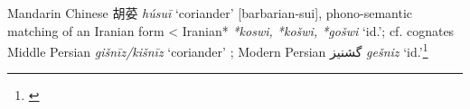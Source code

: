 \begin{etymology}\label{ety:husui}
Mandarin Chinese {胡荽} \textit{húsuī} `coriander' [barbarian-sui], phono-semantic matching of an Iranian form
< Iranian* \textit{*koswi, *košwi, *gošwi} `id.'; cf. cognates Middle Persian \textit{gišnīz/kišnīz} `coriander'  ; Modern Persian گشنیز‎ \textit{gešniz} `id.'\footnote{\textcite{laufer_sino-iranica_1919}}
\end{etymology}